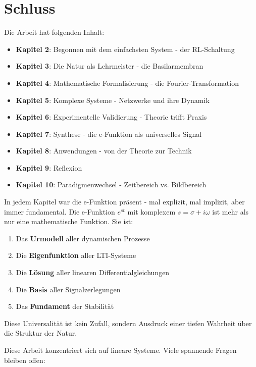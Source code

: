 ﻿\documentclass[a4paper,12pt]{report}
\theoremstyle{definition}
\begin{document}
	\chapter{Schluss}
	
	Die Arbeit hat folgenden Inhalt:
	
	\begin{itemize}
		\item[-] \textbf{Kapitel 2}: Begonnen mit dem einfachsten System - der RL-Schaltung
		\item[-] \textbf{Kapitel 3}: Die Natur als Lehrmeister - die Basilarmembran
		\item[-] \textbf{Kapitel 4}: Mathematische Formalisierung - die Fourier-Transformation
		\item[-] \textbf{Kapitel 5}: Komplexe Systeme - Netzwerke und ihre Dynamik
		\item[-] \textbf{Kapitel 6}: Experimentelle Validierung - Theorie trifft Praxis
		\item[-] \textbf{Kapitel 7}: Synthese - die e-Funktion als universelles Signal
		\item[-] \textbf{Kapitel 8}: Anwendungen - von der Theorie zur Technik
		\item[-] \textbf{Kapitel 9}: Reflexion
		\item[-] \textbf{Kapitel 10}: Paradigmenwechsel - Zeitbereich vs. Bildbereich
	\end{itemize}
	In jedem Kapitel war die e-Funktion präsent - mal explizit, mal implizit, aber immer fundamental. Die e-Funktion $e^{st}$ mit komplexem $s = \sigma + i\omega$ ist mehr als nur eine mathematische Funktion. Sie ist:
		
	\begin{enumerate}
		\item[-] Das \textbf{Urmodell} aller dynamischen Prozesse
		\item[-] Die \textbf{Eigenfunktion} aller LTI-Systeme
		\item[-] Die \textbf{Lösung} aller linearen Differentialgleichungen
		\item[-] Die \textbf{Basis} aller Signalzerlegungen
		\item[-] Das \textbf{Fundament} der Stabilität
	\end{enumerate}
	Diese Universalität ist kein Zufall, sondern Ausdruck einer tiefen Wahrheit über die Struktur der Natur.
	
	Diese Arbeit konzentriert sich auf lineare Systeme. Viele spannende Fragen bleiben offen:
	
\end{document}
